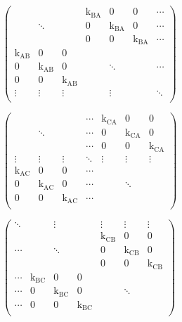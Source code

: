 \documentclass[a4paper,11pt,twoside,openright]{book}
\def\lthtmlcheckvsize{\ifdim\ht\sizebox<\vsize 
  \ifdim\wd\sizebox<\hsize\expandafter\hfill\fi \expandafter\vfill
  \else\expandafter\vss\fi}%
\begin{document}
{\newpage\clearpage
{}%
$\displaystyle \begin{pmatrix}
&         &         & \textrm{k}_{\textrm{BA}}& 0       & 0       & \cdots \\
& \ddots  &         & 0       & \textrm{k}_{\textrm{BA}}& 0       & \cdots \\
&         &         & 0       & 0       & \textrm{k}_{\textrm{BA}}& \cdots \\
\textrm{k}_{\textrm{AB}}& 0       & 0       &         &         &         & \\
0       & \textrm{k}_{\textrm{AB}}& 0       &         & \ddots  &         & \cdots\\
0       & 0       & \textrm{k}_{\textrm{AB}}&         &         &         & \\
\vdots  & \vdots  & \vdots  &         & \vdots  &         & \ddots \\
\end{pmatrix}$%
\lthtmlindisplaymathZ
\lthtmlcheckvsize\clearpage}

{\newpage\clearpage
{}%
$\displaystyle \begin{pmatrix}
&         &         & \cdots  & \textrm{k}_{\textrm{CA}}& 0       & 0 \\
& \ddots  &         & \cdots  & 0       & \textrm{k}_{\textrm{CA}}& 0 \\
&         &         & \cdots  & 0       & 0       & \textrm{k}_{\textrm{CA}}\\
\vdots  & \vdots  & \vdots  & \ddots  & \vdots  & \vdots  & \vdots \\
\textrm{k}_{\textrm{AC}}& 0       & 0       & \cdots  &         &         & \\
0       & \textrm{k}_{\textrm{AC}}& 0       & \cdots  &         & \ddots  &  \\
0       & 0       & \textrm{k}_{\textrm{AC}}& \cdots  &         &         & \\
\end{pmatrix}$%
\lthtmlindisplaymathZ
\lthtmlcheckvsize\clearpage}

{\newpage\clearpage
{}%
$\displaystyle \begin{pmatrix}
\ddots  &         & \vdots  &         & \vdots  & \vdots  & \vdots \\
&         &         &         & \textrm{k}_{\textrm{CB}}& 0       & 0 \\
\cdots  &         & \ddots  &         & 0       & \textrm{k}_{\textrm{CB}}& 0 \\
&         &         &         & 0       & 0       & \textrm{k}_{\textrm{CB}}\\
\cdots  & \textrm{k}_{\textrm{BC}}& 0       & 0       &         &         &  \\
\cdots  & 0       & \textrm{k}_{\textrm{BC}}& 0       &         & \ddots  &  \\
\cdots  & 0       & 0       & \textrm{k}_{\textrm{BC}}&         &         &  \\
\end{pmatrix}$%
\lthtmlindisplaymathZ
\lthtmlcheckvsize\clearpage}
\end{document}
